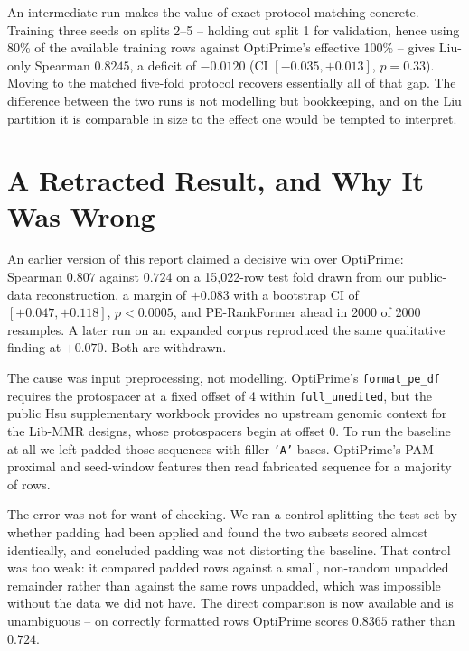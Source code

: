 \documentclass[11pt]{article}
\begin{document}
An intermediate run makes the value of exact protocol matching concrete. Training
three seeds on splits 2--5 -- holding out split 1 for validation, hence using 80\%
of the available training rows against OptiPrime's effective 100\% -- gives Liu-only
Spearman $0.8245$, a deficit of $-0.0120$ (CI $[-0.035, +0.013]$, $p=0.33$). Moving
to the matched five-fold protocol recovers essentially all of that gap. The
difference between the two runs is not modelling but bookkeeping, and on the Liu
partition it is comparable in size to the effect one would be tempted to interpret.


\section{A Retracted Result, and Why It Was Wrong}
\label{sec:retraction}

An earlier version of this report claimed a decisive win over OptiPrime: Spearman
$0.807$ against $0.724$ on a 15{,}022-row test fold drawn from our public-data
reconstruction, a margin of $+0.083$ with a bootstrap CI of $[+0.047, +0.118]$,
$p<0.0005$, and PE-RankFormer ahead in 2000 of 2000 resamples. A later run on an
expanded corpus reproduced the same qualitative finding at $+0.070$. Both are
withdrawn.

The cause was input preprocessing, not modelling. OptiPrime's \texttt{format\_pe\_df}
requires the protospacer at a fixed offset of 4 within \texttt{full\_unedited}, but
the public Hsu supplementary workbook provides no upstream genomic context for the
Lib-MMR designs, whose protospacers begin at offset 0. To run the baseline at all we
left-padded those sequences with filler \texttt{'A'} bases. OptiPrime's PAM-proximal
and seed-window features then read fabricated sequence for a majority of rows.

The error was not for want of checking. We ran a control splitting the test set by
whether padding had been applied and found the two subsets scored almost
identically, and concluded padding was not distorting the baseline. That control was
too weak: it compared padded rows against a small, non-random unpadded remainder
rather than against the same rows unpadded, which was impossible without the data we
did not have. The direct comparison is now available and is unambiguous -- on
correctly formatted rows OptiPrime scores $0.8365$ rather than $0.724$.
\end{document}
